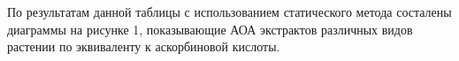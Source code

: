 По результатам данной таблицы с использованием статического метода
состалены диаграммы на рисунке 1, показывающие АОА экстрактов различных
видов растении по эквиваленту к аскорбиновой кислоты.

% 
% 
% 
% 
% 
% 
% 
% 
% 
% 
% 
% 
% 
% 
% 
% 
% 
% 
% 
% 
% 
% 
% 
% 
% 

